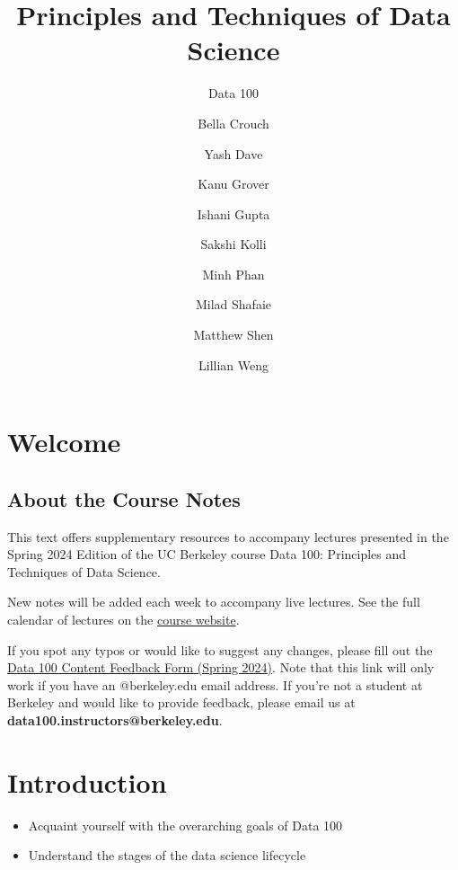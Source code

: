 \documentclass[
  letterpaper,
  DIV=11,
  numbers=noendperiod]{scrreprt}
\title{Principles and Techniques of Data Science}
\subtitle{Data 100}
\author{Bella Crouch \and Yash Dave \and Kanu Grover \and Ishani
Gupta \and Sakshi Kolli \and Minh Phan \and Milad Shafaie \and Matthew
Shen \and Lillian Weng}
\date{}
\providecommand{\tightlist}{%
  \setlength{\itemsep}{0pt}\setlength{\parskip}{0pt}}\usepackage{longtable,booktabs,array}
\renewcommand*\contentsname{Table of contents}
\newcommand\contentsname{Table of contents}
\begin{document}
\maketitle

\renewcommand*\contentsname{Table of contents}
{
\hypersetup{linkcolor=}
\setcounter{tocdepth}{2}
\tableofcontents
}

\chapter*{Welcome}\label{welcome}


\section*{About the Course Notes}\label{about-the-course-notes}


This text offers supplementary resources to accompany lectures presented
in the Spring 2024 Edition of the UC Berkeley course Data 100:
Principles and Techniques of Data Science.

New notes will be added each week to accompany live lectures. See the
full calendar of lectures on the \href{https://ds100.org/sp24/}{course
website}.

If you spot any typos or would like to suggest any changes, please fill
out the \href{https://forms.gle/UL4xMNZVmjTbBLea9}{Data 100 Content
Feedback Form (Spring 2024)}. Note that this link will only work if you
have an @berkeley.edu email address. If you're not a student at Berkeley
and would like to provide feedback, please email us at
\textbf{data100.instructors@berkeley.edu}.


\chapter{Introduction}\label{introduction}

\begin{tcolorbox}[enhanced jigsaw, bottomrule=.15mm, coltitle=black, breakable, titlerule=0mm, colframe=quarto-callout-note-color-frame, leftrule=.75mm, arc=.35mm, colbacktitle=quarto-callout-note-color!10!white, rightrule=.15mm, opacityback=0, toptitle=1mm, bottomtitle=1mm, toprule=.15mm, left=2mm, opacitybacktitle=0.6, title=\textcolor{quarto-callout-note-color}{\faInfo}\hspace{0.5em}{Learning Outcomes}, colback=white]

\begin{itemize}
\tightlist
\item
  Acquaint yourself with the overarching goals of Data 100
\item
  Understand the stages of the data science lifecycle
\end{itemize}

\end{tcolorbox}
\end{document}
